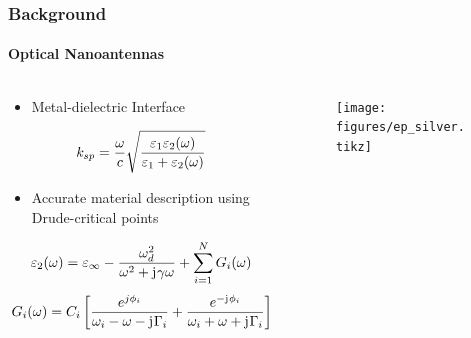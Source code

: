 \documentclass[mathserif,16pt,xcolor=table]{beamer}
\begin{document}
  \begin{frame}
    \frametitle{Background}
    \framesubtitle{Optical Nanoantennas}
    \begin{columns}[T] %
      \begin{column}{.5\textwidth}
        \begin{itemize}
          \item Metal-dielectric Interface
        \end{itemize}
        \begin{equation} \nonumber
          k_{sp}=\frac{\omega}{c}\sqrt {\dfrac {\varepsilon_{1}\varepsilon_{2}(\omega)} {\varepsilon_{1} + \varepsilon_{2}(\omega)}}
          \label{eq:dis_spp}
        \end{equation}
        \begin{itemize}
          \item Accurate material description using Drude-critical points
        \end{itemize}
        \begin{equation} \nonumber
          \varepsilon_2(\omega) = \varepsilon_{\infty} - \frac{\omega_{d}^{2}}{\omega^2 + \mathrm{j}\mkern1mu\gamma \omega} + \sum \limits_{i = 1}^N G_i(\omega)
          \label{eq:eps_drude_cp}
        \end{equation}
        \begin{equation} \nonumber
          G_i(\omega) = C_i \left[ \frac{e^{j \phi_i}}{\omega_i - \omega - \mathrm{j}\mkern1mu \Gamma_i} + \frac{e^{-\mathrm{j}\mkern1mu \phi_i}}{\omega_i + \omega + \mathrm{j}\mkern1mu \Gamma_i} \right]
          \label{eq:CP_terms}
        \end{equation}
      \end{column}
      \begin{column}[T]{.5\textwidth}
        \centering
          \begin{figure}
            \vspace*{-2cm}
            \texttt{[image: figures/ep\_silver.tikz]}
            \label{fig:ep_silver}
          \end{figure}
          \begin{figure}
            \vspace*{-.3cm}

\end{figure}
\end{column}
\end{columns}
\end{frame}
\end{document}
